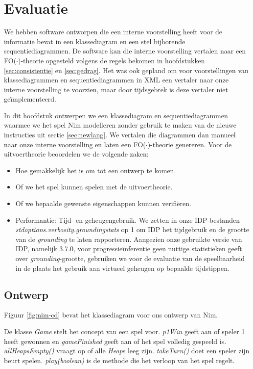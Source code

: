 \chapter{Evaluatie}\label{sec:evaluatie}
We hebben software ontworpen die een interne voorstelling heeft voor de informatie bevat in een klassediagram en een stel bijhorende sequentiediagrammen. De software kan die interne voorstelling vertalen naar een FO($\cdot$)-theorie opgesteld volgens de regels bekomen in hoofdstukken \ref{sec:consistentie} en \ref{sec:gedrag}. Het was ook gepland om voor voorstellingen van klassediagrammen en sequentiediagrammen in XML een vertaler naar onze interne voorstelling te voorzien, maar door tijdsgebrek is deze vertaler niet ge\"implementeerd.

In dit hoofdstuk ontwerpen we een klassediagram en sequentiediagrammen waarmee we het spel Nim modelleren zonder gebruik te maken van de nieuwe instructies uit sectie \ref{sec:newlang}. We vertalen die diagrammen dan manueel naar onze interne voorstelling en laten een FO($\cdot$)-theorie genereren. Voor de uitvoertheorie beoordelen we de volgende zaken:

\begin{itemize}
	\item Hoe gemakkelijk het is om tot een ontwerp te komen.
	\item Of we het spel kunnen spelen met de uitvoertheorie.
	\item Of we bepaalde gewenste eigenschappen kunnen verifi\"eren.
	\item Performantie: Tijd- en geheugengebruik. We zetten in onze IDP-bestanden \textit{stdoptions.verbosity.groundingstats} op 1 om IDP het tijdgebruik en de grootte van de \textit{grounding}\cite{DeCatBroes2014PLaa} te laten rapporteren. Aangezien onze gebruikte versie van IDP, namelijk 3.7.0, voor progressie\"inferentie geen nuttige statistieken geeft over \textit{grounding}-grootte, gebruiken we voor de evaluatie van de speelbaarheid in de plaats het gebruik aan virtueel geheugen op bepaalde tijdstippen.
\end{itemize}

\section{Ontwerp}

Figuur \ref{fig:nim-cd} bevat het klassediagram voor ons ontwerp van Nim.

De klasse \textit{Game} stelt het concept van een spel voor. \textit{p1Win} geeft aan of speler 1 heeft gewonnen en \textit{gameFinished} geeft aan of het spel volledig gespeeld is. \textit{allHeapsEmpty()} vraagt op of alle \textit{Heap}s leeg zijn. \textit{takeTurn()} doet een speler zijn beurt spelen. \textit{play(boolean)} is de methode die het verloop van het spel regelt.

